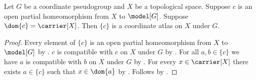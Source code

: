 \begin{theorem}\label{single_chart_atlas}
    Let $G$ be a coordinate pseudogroup and $X$ be a topological space.
    Suppose $c$ is an open partial homeomorphism from $X$ to $\model[G]$.
    Suppose $\dom{c}=\carrier[X]$.
    Then $\{c\}$ is a coordinate atlas on $X$ under $G$.
\end{theorem}
\begin{proof}
    Every element of $\{c\}$ is an open partial homeomorphism from $X$ to $\model[G]$
        by .
    $c$ is compatible with $c$ on $X$ under $G$ by
        .
    For all $a,b\in\{c\}$ we have $a$ is compatible with $b$ on $X$ under $G$ by
        .
    For every $x\in\carrier[X]$ there exists $a\in\{c\}$ such that $x\in\dom{a}$ by
        .
    Follows by .
\end{proof}

